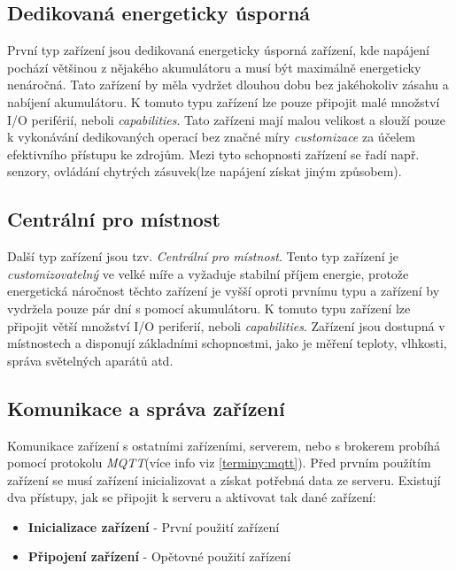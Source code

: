 \subsection*{Dedikovaná energeticky úsporná}
\label{hardware:usporna}
První typ zařízení jsou dedikovaná energeticky úsporná zařízení, kde napájení pochází většinou z nějakého akumulátoru a musí být maximálně energeticky nenáročná.
Tato zařízení by měla vydržet dlouhou dobu bez jakéhokoliv zásahu a nabíjení akumulátoru.
K tomuto typu zařízení lze pouze připojit malé množství I/O periférií, neboli \emph{capabilities}.
Tato zařízeni mají malou velikost a slouží pouze k vykonávání dedikovaných operací bez značné míry \emph{customizace} za účelem efektivního přístupu ke zdrojům.
Mezi tyto schopnosti zařízení se řadí např. senzory, ovládání chytrých zásuvek(lze napájení získat jiným způsobem).

\subsection*{Centrální pro místnost}
\label{hardware:centralni}
Další typ zařízení jsou tzv. \emph{Centrální pro místnost}.
Tento typ zařízení je \emph{customizovatelný} ve velké míře a vyžaduje stabilní příjem energie, protože energetická náročnost těchto zařízení je vyšší oproti prvnímu typu a zařízení by vydržela pouze pár dní s pomocí akumulátoru.
K tomuto typu zařízení lze připojit větší množství I/O periferií, neboli \emph{capabilities}.
Zařízení jsou dostupná v místnostech a disponují základními schopnostmi, jako je měření teploty, vlhkosti, správa světelných aparátů atd.

\newpage
\subsection*{Komunikace a správa zařízení}
\label{hardware:komunikace}

Komunikace zařízení s ostatními zařízeními, serverem, nebo s brokerem probíhá pomocí protokolu \emph{MQTT}(více info viz \ref{terminy:mqtt}).
Před prvním použítím zařízení se musí zařízení inicializovat a získat potřebná data ze serveru.
Existují dva přístupy, jak se připojit k serveru a aktivovat tak dané zařízení:
\begin{itemize}
  \item \textbf{Inicializace zařízení} - První použití zařízení
  \item \textbf{Připojení zařízení} - Opětovné použití zařízení
\end{itemize}

